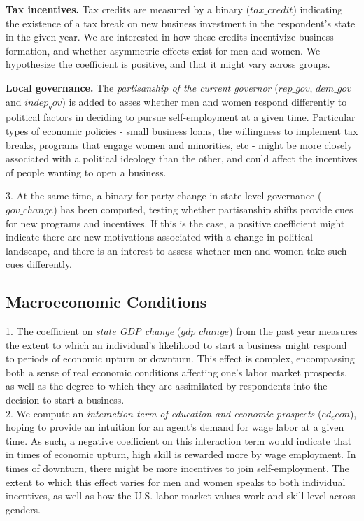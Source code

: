 \textbf{Tax incentives.} Tax credits are measured by a binary ($tax\_credit$) indicating the existence of a tax break on new business investment in the respondent's state in the given year. We are interested in how these credits incentivize business formation, and whether asymmetric effects exist for men and women. We hypothesize the coefficient is positive, and that it might vary across groups.

\textbf{Local governance.} The \textit{partisanship of the current governor} ($rep\_gov$, $dem\_gov$ and $indep_gov$) is added to asses whether men and women respond differently to political factors in deciding to pursue self-employment at a given time. Particular types of economic policies - small business loans, the willingness to implement tax breaks, programs that engage women and minorities, etc - might be more closely associated with a political ideology than the other, and could affect the incentives of people wanting to open a business. 

3. At the same time, a binary for party change in state level governance ($gov\_change$) has been computed, testing whether partisanship shifts provide cues for new programs and incentives. If this is the case, a positive coefficient might indicate there are new motivations associated with a change in political landscape, and there is an interest to assess whether men and women take such cues differently. 


\subsection{Macroeconomic Conditions}

1. The coefficient on \textit{state GDP change} ($gdp\_change$) from the past year measures the extent to which an individual's likelihood to start a business might respond to periods of economic upturn or downturn. This effect is complex, encompassing both a sense of real economic conditions affecting one's labor market prospects, as well as the degree to which they are assimilated by respondents into the decision to start a business. \\

2. We compute an \textit{interaction term of education and economic prospects} ($ed_econ$), hoping to provide an intuition for an agent's demand for wage labor at a given time. As such, a negative coefficient on this interaction term would indicate that in times of economic upturn, high skill is rewarded more by wage employment. In times of downturn, there might be more incentives to join self-employment. The extent to which this effect varies for men and women speaks to both individual incentives, as well as how the U.S. labor market values work and skill level across genders. 

